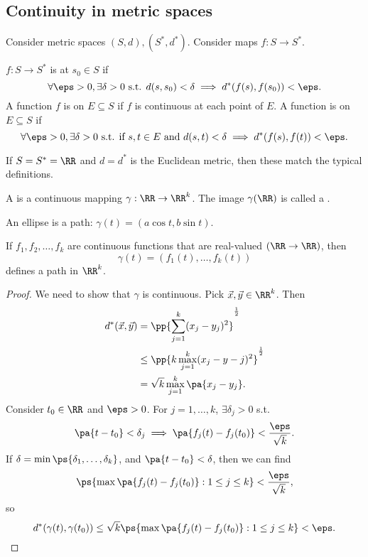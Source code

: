 \documentclass[11pt]{scrartcl}
\numberwithin{equation}{section}
\begin{document}
\subsection{Continuity in metric spaces}

Consider metric spaces $(S,d), (S^*,d^*)$. Consider maps $f : S \rightarrow S^*$.
\begin{definition}
    $f : S \rightarrow S^*$ is  at $s_0\in S$ if 
    \[
        \forall \eps>0, \exists \delta>0 \text{ s.t. } d(s,s_0) < \delta \implies d^*(f(s), f(s_0)) < \eps.
    \]
    A function $f$ is  on $E \subseteq S$ if $f$ 
    is continuous at each point of $E$.
    A function is  on $E \subseteq S$ if 
    \[
        \forall \eps>0, \exists \delta>0 \text{ s.t. if } s,t\in E 
        \text{ and } d(s,t) < \delta \implies d^*(f(s), f(t)) < \eps.
    \]
\end{definition}

If $S=S^* = \RR$ and $d=d^*$ is the Euclidean metric, then these match 
the typical definitions.

\begin{definition}
    A  is a continuous mapping $\gamma : \RR \rightarrow \RR^k$.
    The image $\gamma(\RR)$ is called a .
\end{definition}

\begin{example}
    An ellipse is a path: $\gamma(t) = (a\cos t, b\sin t)$.
\end{example}

\begin{proposition}
    If $f_1,f_2,\dots,f_k$ are continuous functions that are real-valued
    $(\RR\to \RR)$, then 
    \[
        \gamma(t) = (f_1(t),\dots, f_k(t))
    \]
    defines a path in $\RR^k$.
\end{proposition}

\begin{proof}
    We need to show that $\gamma$ is continuous. Pick 
    $\vec{x}, \vec{y}\in \RR^k$. Then 
    \begin{align*}
        d^*(\vec{x},\vec{y}) &= \pp{\sum_{j=1}^{k}(x_j-y_j)^2}^{\frac{1}{2}}\\
        &\leq \pp{k \max_{j=1}^k (x_j-y-j)^2}^{\frac{1}{2}} \\
        &= \sqrt{k} \max_{j=1}^k \pa{x_j-y_j}.
    \end{align*}
    Consider $t_0\in \RR$ and $\eps>0$. For $j=1,\dots,k$, 
    $\exists \delta_j>0$ s.t. 
    \[
        \pa{t-t_0} < \delta_j \implies \pa{f_j(t)-f_j(t_0)} < \frac{\eps}{\sqrt k}.
    \]
    If $\delta = \min\ps{\delta_1,\dots,\delta_k}$, and $\pa{t-t_0} < \delta$,
    then we can find 
    \[
        \ps{\max{\pa{f_j(t)-f_j(t_0)}:1\leq j\leq k}} < \frac{\eps}{\sqrt k},
    \]
    so 
    \[
        d^*(\gamma(t), \gamma(t_0)) \leq \sqrt k  \ps{\max{\pa{f_j(t)-f_j(t_0)}:1\leq j\leq k}} < \eps. \qedhere
    \]
\end{proof}
\end{document}
